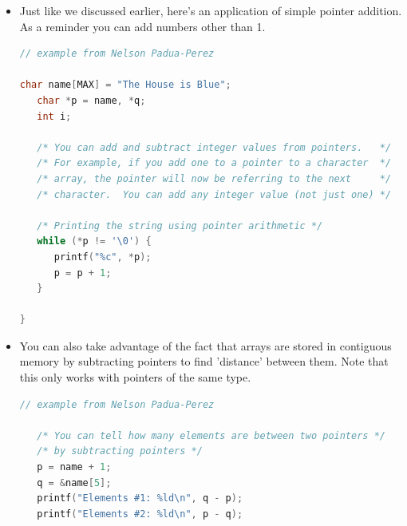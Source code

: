 \documentclass[english, 10pt]{article}
\begin{document}
\begin{itemize}
	\item Just like we discussed earlier, here's an application of simple pointer addition. As a reminder you can add numbers other than 1.
	\begin{lstlisting}[language=C]
// example from Nelson Padua-Perez

char name[MAX] = "The House is Blue";                                              
   char *p = name, *q;                                                                
   int i;                                                                             
                                                                                      
   /* You can add and subtract integer values from pointers.   */                     
   /* For example, if you add one to a pointer to a character  */                     
   /* array, the pointer will now be referring to the next     */                     
   /* character.  You can add any integer value (not just one) */                     
                                                                                      
   /* Printing the string using pointer arithmetic */                                 
   while (*p != '\0') {                                                               
      printf("%c", *p);                                                               
      p = p + 1;                                                                      
   }
   
}

\end{lstlisting}

	\item You can also take advantage of the fact that arrays are stored in contiguous memory by subtracting pointers to find 'distance' between them. Note that this only works with pointers of the same type.
	
\begin{lstlisting}[language=C]
// example from Nelson Padua-Perez

   /* You can tell how many elements are between two pointers */                      
   /* by subtracting pointers */                                                      
   p = name + 1;                                                                      
   q = &name[5];                                                                      
   printf("Elements #1: %ld\n", q - p);                                               
   printf("Elements #2: %ld\n", p - q);


\end{lstlisting}
\end{itemize}
\end{document}
